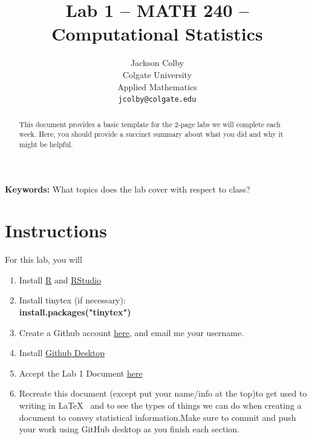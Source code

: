 \documentclass{article}\usepackage[]{graphicx}\usepackage[]{xcolor}
\begin{document}
\vspace{-1in}
\title{Lab 1 -- MATH 240 -- Computational Statistics}

\author{
  Jackson Colby \\
  Colgate University  \\
  Applied Mathematics  \\
  {\tt jcolby@colgate.edu} }

\date{}

\maketitle

\begin{multicols}{2}
\begin{abstract}
This document provides a basic template for the 2-page labs we will complete each week. Here, you should provide a succinct summary about what you did and why it might be helpful.
\end{abstract}

\textbf{Keywords:} What topics does the lab cover with respect
 to class?



\section{Instructions}
For this lab, you will
\begin{enumerate}[1.]\itemsep0em
\item Install \href{https://cran.rstudio.com/}{R} and \href{https://posit.co/download/rstudio-desktop/}{RStudio}
\item Install tinytex (if necessary): \\ \textbf{install.packages("tinytex")}
\item Create a Github account \href{ https://github.com/}{here}, and email me your username.
\item Install \href{https://github.com/apps/desktop}{Github Desktop} 
\item Accept the Lab 1 Document \href{https://github.com/login?client_id=Iv1.a84bfcae38835499&return_to=%2Flogin%2Foauth%2Fauthorize%3Fclient_id%3DIv1.a84bfcae38835499%26redirect_uri%3Dhttps%253A%252F%252Fclassroom.github.com%252Fauth%252Fgithub%252Fcallback%26response_type%3Dcode%26state%3D3567fc1aae917e5c0b1e3adfdc1ef646081add6f7014be60}{here}
\item Recreate this document (except put your name/info at
 the top)to get used to writing in \LaTeX~ and to see the
 types of things we can do when creating a document
 to convey statistical information.Make sure to commit
 and push your work using GitHub desktop as you finish
 each section.
\end{enumerate}


\end{multicols}
\end{document}
